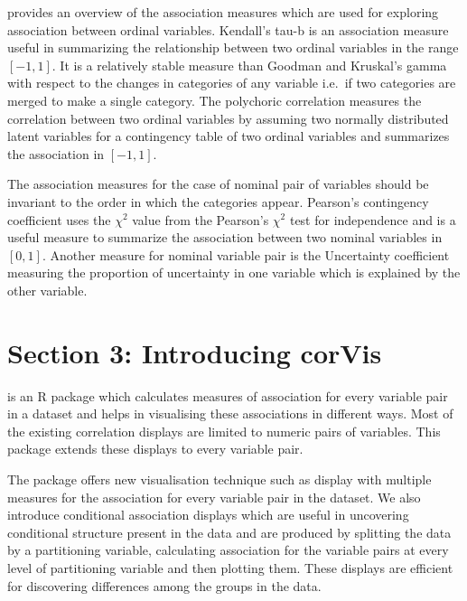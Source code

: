 \citet{agresti2010analysis} provides an overview of the association
measures which are used for exploring association between ordinal
variables. Kendall's tau-b \citep{kendall1945treatment} is an
association measure useful in summarizing the relationship between two
ordinal variables in the range \([-1,1]\). It is a relatively stable
measure than Goodman and Kruskal's gamma with respect to the changes in
categories of any variable i.e.~if two categories are merged to make a
single category. The polychoric correlation \citep{olsson1979maximum}
measures the correlation between two ordinal variables by assuming two
normally distributed latent variables for a contingency table of two
ordinal variables and summarizes the association in \([-1,1]\).

The association measures for the case of nominal pair of variables
should be invariant to the order in which the categories appear.
Pearson's contingency coefficient uses the \({\chi}^2\) value from the
Pearson's \({\chi}^2\) test for independence and is a useful measure to
summarize the association between two nominal variables in \([0,1]\).
Another measure for nominal variable pair is the Uncertainty coefficient
\citep{theil1970estimation} measuring the proportion of uncertainty in
one variable which is explained by the other variable.

\hypertarget{section-3-introducing-corvis}{%
\section{Section 3: Introducing
corVis}\label{section-3-introducing-corvis}}

 is an R package which calculates measures of
association for every variable pair in a dataset and helps in
visualising these associations in different ways. Most of the existing
correlation displays are limited to numeric pairs of variables. This
package extends these displays to every variable pair.

The package offers new visualisation technique such as display with
multiple measures for the association for every variable pair in the
dataset. We also introduce conditional association displays which are
useful in uncovering conditional structure present in the data and are
produced by splitting the data by a partitioning variable, calculating
association for the variable pairs at every level of partitioning
variable and then plotting them. These displays are efficient for
discovering differences among the groups in the data.

